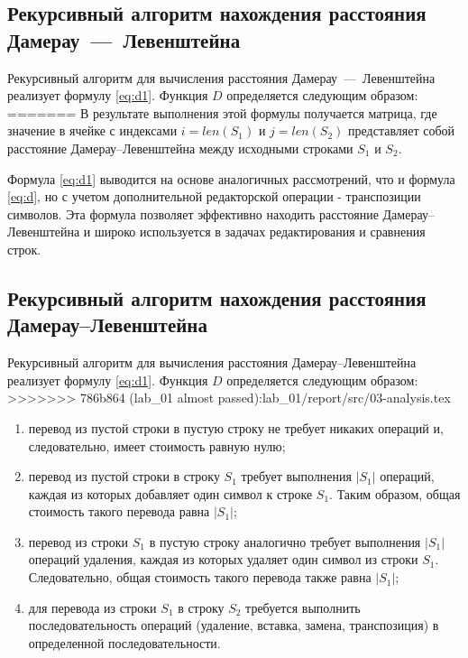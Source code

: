 \newpage
\subsection{Рекурсивный алгоритм нахождения расстояния Дамерау~---~Левенштейна}

Рекурсивный алгоритм для вычисления расстояния Дамерау~---~Левенштейна реализует формулу \ref{eq:d1}. Функция $D$ определяется следующим образом:
=======
В результате выполнения этой формулы получается матрица, где значение в ячейке с индексами $i = len	(S_{1})$ и $j = len(S_{2})$ представляет собой расстояние Дамерау--Левенштейна между исходными строками $S_{1}$ и $S_{2}$.

Формула \ref{eq:d1} выводится на основе аналогичных рассмотрений, что и формула \ref{eq:d}, но с учетом дополнительной редакторской операции - транспозиции символов. 
Эта формула позволяет эффективно находить расстояние Дамерау--Левенштейна и широко используется в задачах редактирования и сравнения строк.

\newpage
\subsection{Рекурсивный алгоритм нахождения расстояния Дамерау--Левенштейна}

Рекурсивный алгоритм для вычисления расстояния Дамерау--Левенштейна реализует формулу \ref{eq:d1}. Функция $D$ определяется следующим образом:
>>>>>>> 786b864 (lab_01 almost passed):lab_01/report/src/03-analysis.tex

\begin{enumerate}[label=\arabic*)]
	\item перевод из пустой строки в пустую строку не требует никаких операций и, следовательно, имеет стоимость равную нулю;
	\item перевод из пустой строки в строку $S_{1}$ требует выполнения $|S_{1}|$ операций, каждая из которых добавляет один символ к строке $S_{1}$. Таким образом, общая стоимость такого перевода равна $|S_{1}|$;
	\item перевод из строки $S_{1}$ в пустую строку аналогично требует выполнения $|S_{1}|$ операций удаления, каждая из которых удаляет один символ из строки $S_{1}$. Следовательно, общая стоимость такого перевода также равна $|S_{1}|$;
	\item для перевода из строки $S_{1}$ в строку $S_{2}$ требуется выполнить последовательность операций (удаление, вставка, замена, транспозиция) в определенной последовательности.
\end{enumerate}

